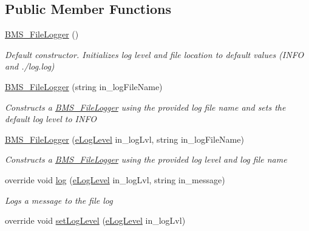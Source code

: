\subsection*{Public Member Functions}
\begin{DoxyCompactItemize}
\item 
\hyperlink{class_b_m_s_1_1_core_1_1_b_m_s___file_logger_a4af5a9f2c7dfb54a63af58073771cf7c}{B\-M\-S\-\_\-\-File\-Logger} ()
\begin{DoxyCompactList}\small\item\em Default constructor. Initializes log level and file location to default values (I\-N\-F\-O and ./log.log) \end{DoxyCompactList}\item 
\hyperlink{class_b_m_s_1_1_core_1_1_b_m_s___file_logger_a35b23ae9c864c71487439c1d23ad3852}{B\-M\-S\-\_\-\-File\-Logger} (string in\-\_\-log\-File\-Name)
\begin{DoxyCompactList}\small\item\em Constructs a \hyperlink{class_b_m_s_1_1_core_1_1_b_m_s___file_logger}{B\-M\-S\-\_\-\-File\-Logger} using the provided log file name and sets the default log level to I\-N\-F\-O \end{DoxyCompactList}\item 
\hyperlink{class_b_m_s_1_1_core_1_1_b_m_s___file_logger_a000dfc0708ec465e275fbb155bd8df26}{B\-M\-S\-\_\-\-File\-Logger} (\hyperlink{namespace_b_m_s_1_1_core_a327c4f5128504a45ef61f00cfd661a43}{e\-Log\-Level} in\-\_\-log\-Lvl, string in\-\_\-log\-File\-Name)
\begin{DoxyCompactList}\small\item\em Constructs a \hyperlink{class_b_m_s_1_1_core_1_1_b_m_s___file_logger}{B\-M\-S\-\_\-\-File\-Logger} using the provided log level and log file name \end{DoxyCompactList}\item 
override void \hyperlink{class_b_m_s_1_1_core_1_1_b_m_s___file_logger_a98aa2f42304a3e323ea5b9991534aa9d}{log} (\hyperlink{namespace_b_m_s_1_1_core_a327c4f5128504a45ef61f00cfd661a43}{e\-Log\-Level} in\-\_\-log\-Lvl, string in\-\_\-message)
\begin{DoxyCompactList}\small\item\em Logs a message to the file log \end{DoxyCompactList}\item 
override void \hyperlink{class_b_m_s_1_1_core_1_1_b_m_s___file_logger_a38541edb5b857325dbd4a2493f5913a1}{set\-Log\-Level} (\hyperlink{namespace_b_m_s_1_1_core_a327c4f5128504a45ef61f00cfd661a43}{e\-Log\-Level} in\-\_\-log\-Lvl)

\end{DoxyCompactItemize}

